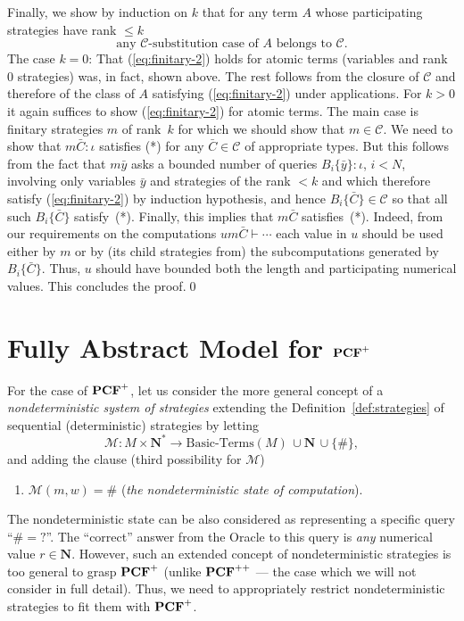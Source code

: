 \documentclass[fleqn]{LMCS}
\theoremstyle{plain}\newtheorem{satz}[thm]{Satz}
\theoremstyle{plain}\newtheorem{hyp}[thm]{Hypothesis}
\theoremstyle{plain}\newtheorem{hyps}[thm]{Hypotheses}
\theoremstyle{definition}\newtheorem{note}[thm]{Note}
\newcommand{\setof}[1]{\{#1\}}
\newcommand{\arr}{\rightarrow}
\newcommand{\NN}{\mathbf{N}}
\newcommand{\PCF}{\mbox{\bf PCF}}
\newcommand{\CC}{{\mathcal C}}
\newcommand{\MM}{{\mathcal M}}
\newcommand{\bY}{\bar{y}}
\newcommand{\bC}{\bar{C}}
\newcommand{\?}{\mbox{?}}
\begin{document}
Finally, we show by induction on $k$ that for any term $A$ whose
participating strategies have rank ${}\le k$  
\begin{equation}\label{eq:finitary-2}
\textrm{any $\CC$-substitution case of $A$ belongs to }\CC.
\end{equation}
The case $k=0$: That (\ref{eq:finitary-2}) holds for atomic terms (variables 
and rank 0 strategies) was, in fact, shown above. The rest follows from 
the closure of $\CC$ and therefore of the class of $A$  satisfying 
(\ref{eq:finitary-2}) under applications. For $k>0$ it again suffices to show 
(\ref{eq:finitary-2}) for atomic terms. The main case is finitary strategies $m$ 
of rank~$k$ for which we should show that $m\in\CC$. We need to show that 
$m\bar{C}:\iota$ satisfies (*) for any $\bar{C}\in\CC$ of appropriate types. 
But this follows from the fact that $m\bY$ asks a bounded number of queries $B_i\setof{\bY}:\iota$, $i<N$, 
involving only variables $\bY$ and 
strategies of the rank ${}<k$ and which therefore satisfy 
(\ref{eq:finitary-2}) by induction hypothesis, 
and hence $B_i\setof{\bC}\in\CC$ so that all such 
$B_i\setof{\bC}$ satisfy~(*). 
Finally, this implies that $m\bC$ satisfies~(*). 
Indeed, from our requirements on the computations $um\bC\vdash\cdots$ 
each value in $u$ should be used either by $m$ or by (its child strategies from) the  
subcomputations generated by $B_i\setof{\bC}$. Thus, $u$ should have bounded both 
the length and participating numerical values. This concludes the proof.\qed



\section{Fully Abstract Model for \texorpdfstring{$\PCF^+$}{PCF+}}
\label{sec:full-abstr-PCF+}

\noindent
For the case of $\PCF^+$, let us consider the more general 
concept of a \emph{nondeterministic system of 
strategies} \cite{Saz76SMZH} extending the Definition~\ref{def:strategies}
of sequential (deterministic) strategies by letting 
\[
\MM:M \times \NN^\ast \arr \mbox{Basic-Terms}(M)\, \cup\NN\, 
\cup\setof{\#},
\]
and adding the clause (third possibility for $\MM$)
\begin{enumerate}[(1)]
\item $\MM(m,w)=\#$ (\emph{the nondeterministic state of computation}).
\end{enumerate}
The nondeterministic state can be also considered as representing a specific query 
``$\#=\?$''. The ``correct'' answer from the Oracle to this query 
is \emph{any} numerical value $r\in \NN$. 
However, such an extended concept of nondeterministic strategies 
is too general to grasp $\PCF^+$ 
(unlike $\PCF^{++}$ --- the case which we will not consider 
in full detail). 
Thus, we need to appropriately restrict nondeterministic strategies 
to fit them with $\PCF^+$. 
\end{document}
